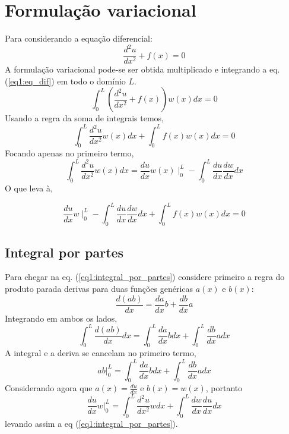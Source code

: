 \section{Formulação variacional}
%
Para considerando a equação diferencial:
%
\begin{equation}
	 \frac{d^2u}{dx^2} + f(x) = 0
	 \label{eq1:eq_dif}
\end{equation}
%
A formulação variacional pode-se ser obtida multiplicado e integrando a eq. (\ref{eq1:eq_dif}) em todo o domínio $L$.
%
\begin{equation}
	\int_0^L\left( \frac{d^2u}{dx^2} + f(x) \right) w(x) dx = 0
\end{equation}
%
Usando a regra da soma de integrais temos,
%
\begin{equation}
	\int_0^L \frac{d^2u}{dx^2} w(x) dx + \int_0^L f(x) w(x) dx= 0
\end{equation}
%
Focando apenas no primeiro termo,
%
\begin{equation}
	\int_0^L \frac{d^2u}{dx^2} w(x) dx  = \frac{du}{dx} w(x) \mid_0^L - \int_0^L \frac{du}{dx} \frac{dw}{dx} dx 
	\label{eq1:integral_por_partes}
\end{equation}
%
O que leva à,

\begin{equation}
	\frac{du}{dx} w \mid_0^L - \int_0^L \frac{du}{dx} \frac{dw}{dx} dx  + \int_0^L f(x) w(x) dx= 0
\end{equation}
%
\subsection{Integral por partes}
%
Para chegar na eq. (\ref{eq1:integral_por_partes}) considere primeiro a regra do produto parada derivas para duas funções genéricas $a(x)$ e $b(x)$:
%
\begin{equation}
	\frac{d(ab)}{dx} = \frac{da}{dx} b + \frac{db}{dx} a
\end{equation}
%
Integrando em ambos os lados,
%
\begin{equation}
	\int_0^L \frac{d(ab)}{dx} dx = \int_0^L \frac{da}{dx} b dx + \int_0^L \frac{db}{dx} a dx
\end{equation}
%
A integral e a deriva se cancelam no primeiro termo,
%
\begin{equation}
	ab|_0^L = \int_0^L \frac{da}{dx} b dx + \int_0^L \frac{db}{dx} a dx
\end{equation}
%
Considerando agora que $a(x) = \frac{du}{dx}$ e $b(x) = w(x)$, portanto 
%
\begin{equation}
	\frac{du}{dx} w|_0^L = \int_0^L \frac{d^2u}{dx^2} w dx + \int_0^L \frac{dw}{dx} \frac{du}{dx} dx
	\label{eq1:formu_var}
\end{equation}
%
levando assim  a eq (\ref{eq1:integral_por_partes}).
%
